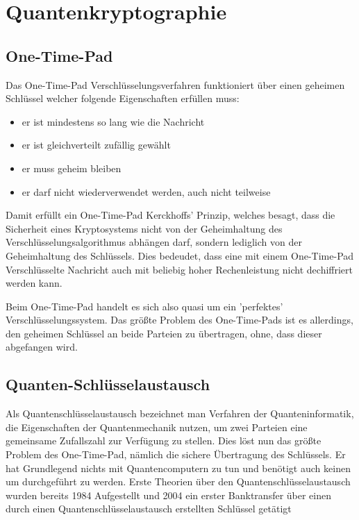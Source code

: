 
\section{Quantenkryptographie}
\label{sec:Quantenkryptographie}

\subsection{One-Time-Pad}

Das One-Time-Pad Verschlüsselungsverfahren funktioniert über einen geheimen Schlüssel welcher folgende Eigenschaften erfüllen muss: \cite{ontetimepadwiki}
\begin{itemize}
    \item er ist mindestens so lang wie die Nachricht
    \item er ist gleichverteilt zufällig gewählt
    \item er muss geheim bleiben
    \item er darf nicht wiederverwendet werden, auch nicht teilweise
\end{itemize}

Damit erfüllt ein One-Time-Pad Kerckhoffs’ Prinzip, welches besagt, dass die Sicherheit eines Kryptosystems nicht von der Geheimhaltung des Verschlüsselungsalgorithmus abhängen darf, sondern lediglich von der Geheimhaltung des Schlüssels.\cite{ontetimepadwiki}
Dies bedeudet, dass eine mit einem One-Time-Pad Verschlüsselte Nachricht auch mit beliebig hoher Rechenleistung nicht dechiffriert werden kann.

Beim One-Time-Pad handelt es sich also quasi um ein 'perfektes' Verschlüsselungssystem.
Das größte Problem des One-Time-Pads ist es allerdings, den geheimen Schlüssel an beide Parteien zu übertragen, ohne, dass dieser abgefangen wird.

\subsection{Quanten-Schlüsselaustausch}
\label{sec:Quanten-Schlusselaustausch}

Als Quantenschlüsselaustausch bezeichnet man Verfahren der Quanteninformatik, die Eigenschaften der Quantenmechanik nutzen, um zwei Parteien eine gemeinsame Zufallszahl zur Verfügung zu stellen.
Dies löst nun das größte Problem des One-Time-Pad, nämlich die sichere Übertragung des Schlüssels.
Er hat Grundlegend nichts mit Quantencomputern zu tun und benötigt auch keinen um durchgeführt zu werden.
Erste Theorien über den Quantenschlüsselaustausch wurden bereits 1984 Aufgestellt und 2004 ein erster Banktransfer über einen durch einen Quantenschlüsselaustausch erstellten Schlüssel getätigt \cite{experiement_qsa}

